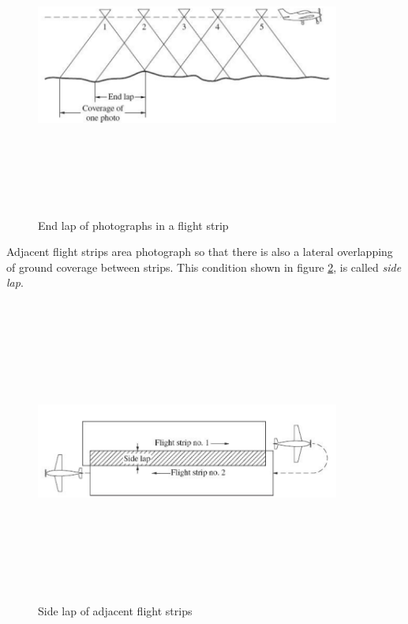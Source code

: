 \begin{figure}[H]
\centering
\includegraphics[width=10cm,height=10cm,keepaspectratio]{imagenes/EndLap.PNG}
\caption{End lap of photographs in a flight strip}
\label{fig:EndLap}
\end{figure}

Adjacent flight strips area photograph so that there is also a lateral overlapping of ground coverage between strips. This condition shown in figure \ref{fig:SideLap}, is called \textit{side lap}\cite{elements_photogrammetry}.
\begin{figure}[H]
\centering
\includegraphics[width=10cm,height=10cm,keepaspectratio]{imagenes/sidelap.PNG}
\caption{Side lap of adjacent flight strips}
\label{fig:SideLap}
\end{figure}

